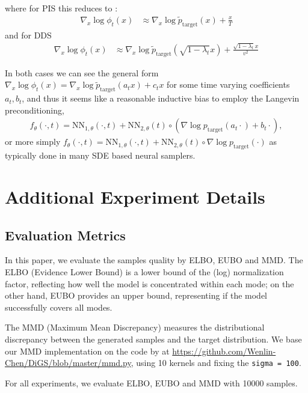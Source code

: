 \documentclass{article} %
\def\ptarget{p_\text{target}}
\def\ptilde{\tilde{p}_\text{target}}
\begin{document}
where for PIS this reduces to :
\begin{align}
    \nabla_x  \log \phi_{t}(x) &\approx \nabla_x\log \ptilde (x) + \frac{x}{T}
\end{align}
and for DDS
\begin{align}
    \nabla_x  \log \phi_{t}(x) &\approx \nabla_x\log \ptilde (\sqrt{1-\lambda_t} x) + \frac{\sqrt{1-\lambda_t}x}{v^2}
\end{align}

In both cases we can see the general form  $ \nabla_x  \log  \phi_{t}(x) =\nabla_x \log  \ptilde (a_t x) + c_t x$ for some time varying coefficients $a_t,b_t$, and thus it seems like a reasonable inductive bias to employ the Langevin preconditioning,
\begin{align}
  f_\theta(\cdot, t) = \text{NN}_{1,\theta}(\cdot, t) + \text{NN}_{2, \theta}(t) \circ ( \nabla\log \ptarget(a_t\cdot) + b_t \cdot),
\end{align}
or more simply $f_\theta(\cdot, t) = \text{NN}_{1,\theta}(\cdot, t) + \text{NN}_{2, \theta}(t) \circ  \nabla\log \ptarget(\cdot)$ as typically done in many SDE based neural samplers.





\section{Additional Experiment Details}




\subsection{Evaluation Metrics}
In this paper, we evaluate the samples quality by ELBO, EUBO and MMD. 
The ELBO (Evidence Lower Bound) is a lower bound of the (log) normalization factor, reflecting how well the model is concentrated within each mode;
on the other hand, EUBO \citep[Evidence Upper Bound, ][]{blessingbeyond}
provides an upper bound, representing if the model successfully covers all modes.
\par
The MMD (Maximum Mean Discrepancy) measures the distributional discrepancy between the generated samples and the target distribution.
We base our MMD implementation on the code by \citet{chen2024diffusivegibbssampling} at \url{https://github.com/Wenlin-Chen/DiGS/blob/master/mmd.py}, using 10 kernels and fixing the \texttt{sigma = 100}.
\par
For all experiments, we evaluate ELBO, EUBO and MMD with 10000 samples.
\end{document}
